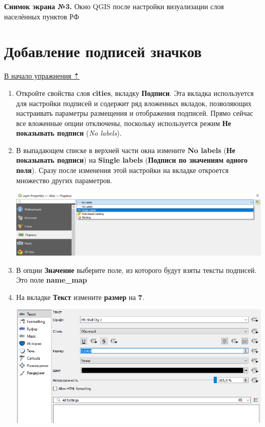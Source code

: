 \documentclass[
  12pt,
]{book}
\begin{document}
\textbf{Снимок экрана №3.} Окно QGIS после настройки визуализации слоя населённых пунктов РФ

\hypertarget{map-design-population-labels}{%
\section{Добавление подписей значков}\label{map-design-population-labels}}

\protect\hyperlink{map-design-population}{В начало упражнения ⇡}

\begin{enumerate}
\def\labelenumi{\arabic{enumi}.}
\item
  Откройте свойства слоя \textbf{cities}, вкладку \textbf{Подписи}. Эта вкладка используется для настройки подписей и содержит ряд вложенных вкладок, позволяющих настраивать параметры размещения и отображения подписей. Прямо сейчас все вложенные опции отключены, поскольку используется режим \textbf{Не показывать подписи} (\emph{No labels}).
\item
  В выпадающем списке в верхней части окна измените \textbf{No labels} (\textbf{Не показывать подписи}) на \textbf{Single labels} (\textbf{Подписи по значениям одного поля}). Сразу после изменения этой настройки на вкладке откроется множество других параметров.

  \includegraphics{images/Ex03/labels01.png}
\item
  В опции \textbf{Значение} выберите поле, из которого будут взяты тексты подписей. Это поле \textbf{name\_map}
\item
  На вкладке \textbf{Текст} измените \textbf{размер} на \textbf{7}.

  \includegraphics{images/Ex03/labels02.png}


\end{enumerate}
\end{document}
